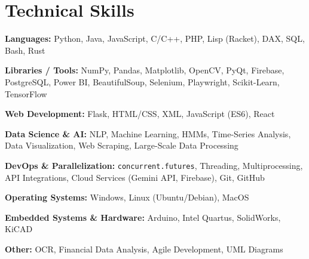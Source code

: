 \documentclass[11pt]{article}
\begin{document}
\section*{Technical Skills}
\begin{small}
\begin{compactitem}
    \item \textbf{Languages:} Python, Java, JavaScript, C/C++, PHP, Lisp (Racket), DAX, SQL, Bash, Rust
    \item \textbf{Libraries / Tools:} NumPy, Pandas, Matplotlib, OpenCV, PyQt, Firebase, PostgreSQL, Power BI, BeautifulSoup, Selenium, Playwright, Scikit-Learn, TensorFlow
    \item \textbf{Web Development:} Flask, HTML/CSS, XML, JavaScript (ES6), React
    \item \textbf{Data Science \& AI:} NLP, Machine Learning, HMMs, Time-Series Analysis, Data Visualization, Web Scraping, Large-Scale Data Processing
    \item \textbf{DevOps \& Parallelization:} \texttt{concurrent.futures}, Threading, Multiprocessing, API Integrations, Cloud Services (Gemini API, Firebase), Git, GitHub
    \item \textbf{Operating Systems:} Windows, Linux (Ubuntu/Debian), MacOS
    \item \textbf{Embedded Systems \& Hardware:} Arduino, Intel Quartus, SolidWorks, KiCAD
    \item \textbf{Other:} OCR, Financial Data Analysis, Agile Development, UML Diagrams
\end{compactitem}
\end{small}


\end{document}
